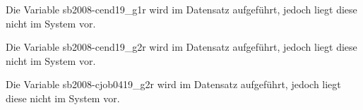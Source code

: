\documentclass[a4paper]{article}
\begin{document}
		Die Variable sb2008-cend19\_g1r wird im Datensatz aufgeführt, jedoch liegt diese nicht im System vor.

		Die Variable sb2008-cend19\_g2r wird im Datensatz aufgeführt, jedoch liegt diese nicht im System vor.

				

				

				

				

				

				

				

				

				

				

				

				

				

				

				

				

				

				

				

				

				

				

				

				

				

		Die Variable sb2008-cjob0419\_g2r wird im Datensatz aufgeführt, jedoch liegt diese nicht im System vor.

				

				

				
\end{document}
